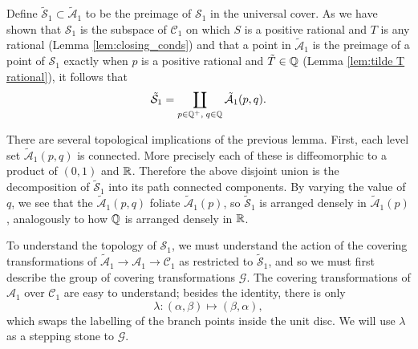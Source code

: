 Define $\mathcal{\tilde{S}}_1 \subset \mathcal{\tilde{A}}_1$ to be the preimage of $\mathcal{S}_1$ in the universal cover. As we have shown that $\mathcal{S}_1$ is the subspace of $\mathcal{C}_1$ on which $S$ is a positive rational and $T$ is any rational (Lemma \ref{lem:closing_conds}) and that a point in $\mathcal{\tilde{A}}_1$ is the preimage of a point of $\mathcal{S}_1$ exactly when $p$ is a positive rational and $\tilde{T} \in \Q$ (Lemma \ref{lem:tilde T rational}), it follows that
\[
\mathcal{\tilde{S}}_1 = \coprod_{p\in \Q^+,\; q\in \Q} \mathcal{\tilde{A}}_1(p,q).
\]

There are several topological implications of the previous lemma. First, each level set $\mathcal{\tilde{A}}_1(p,q)$ is connected. More precisely each of these is diffeomorphic to a product of $(0,1)$ and $\R$. Therefore the above disjoint union is the decomposition of $\mathcal{\tilde{S}}_1$ into its path connected components. By varying the value of $q$, we see that the $\mathcal{\tilde{A}}_1(p,q)$ foliate $\mathcal{\tilde{A}}_1(p)$, so $\mathcal{\tilde{S}}_1$ is arranged densely in $\mathcal{\tilde{A}}_1(p)$, analogously to how $\Q$ is arranged densely in $\R$.

To understand the topology of $\mathcal{S}_1$, we must understand the action of the covering transformations of $\mathcal{\tilde{A}}_1 \to \mathcal{A}_1 \to \mathcal{C}_1$ as restricted to $\tilde{\mathcal{S}}_1$, and so we must first describe the group of covering transformations $\mathcal{G}$. The covering transformations of $\mathcal{A}_1$ over $\mathcal{C}_1$ are easy to understand; besides the identity, there is only
\[
λ : (α,β) \mapsto (β,α),
\]
which swaps the labelling of the branch points inside the unit disc. We will use $λ$ as a stepping stone to $\mathcal{G}$.


